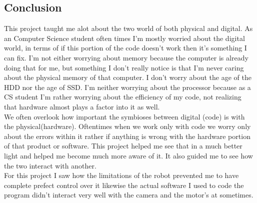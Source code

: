 \documentclass[13ptletterpaper]{paper}
\newcommand\tab[1][1cm]{\hspace*{#1}}
\begin{document}
\begin{flushleft}
		\section{Conclusion}
		\tab This project taught me alot about the two world of both physical and digital. As an Computer Science student often times I'm mostly worried about the digital world, in terms of if this portion of the code doesn't work then it's something I can fix. I'm not either worrying about memory because the computer is already doing that for me, but something I don't really notice is that I'm never caring about the physical memory of that computer. I don't worry about the age of the HDD nor the age of SSD. I'm neither worrying about the processor because as a CS student I'm rather worrying about the efficiency of my code, not realizing that hardware almost plays a factor into it as well. \\
		\tab We often overlook how important the symbioses between digital (code) is with the physical(hardware). Oftentimes when we work only with code we worry only about the errors within it rather if anything is wrong with the hardware portion of that product or software. This project helped me see that in a much better light and helped me become much more aware of it. It also guided me to see how the two interact with another.\\
		\tab For this project I saw how the limitations of the robot prevented me to have complete prefect control over it likewise the actual software I used to code the program didn't interact very well with the camera and the motor's at sometimes.
	\end{flushleft}	
\end{document}
